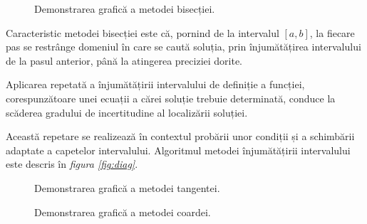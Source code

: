 \begin{figure}[H]
    \centering
    
    \caption{Demonstrarea grafică a metodei bisecției.}
    \label{fig:bisection-figure}
\end{figure}

Caracteristic metodei bisecției este că, pornind de la intervalul $[a,b]$, la fiecare 
pas se restrânge domeniul în care se caută soluția, prin înjumătățirea intervalului 
de la pasul anterior, până la atingerea preciziei dorite. \par

Aplicarea repetată a înjumătățirii intervalului de definiție a funcției, corespunzătoare 
unei ecuații a cărei soluție trebuie determinată, conduce la scăderea gradului de 
incertitudine al localizării soluției. \par

Această repetare se realizează în contextul probării unor condiții și a schimbării 
adaptate a capetelor intervalului. Algoritmul metodei înjumătățirii intervalului este 
descris în \textit{figura \ref{fig:diag}}.

\begin{figure}[H]
    \centering
    
    \caption{Demonstrarea grafică a metodei tangentei.}
    \label{fig:tangent-figure}
\end{figure}

\begin{figure}[H]
    \centering
    
    \caption{Demonstrarea grafică a metodei coardei.}
    \label{fig:regula-falsi-figure}
\end{figure}

\clearpage

